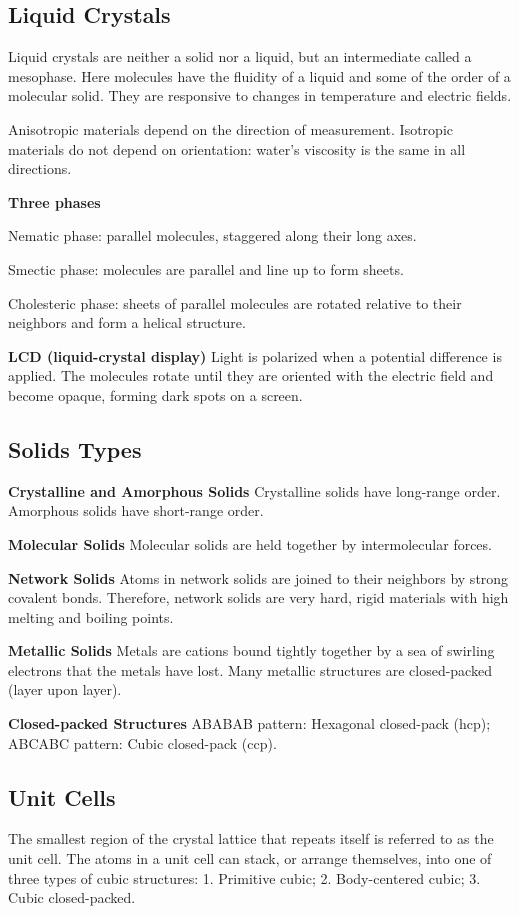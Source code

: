 \documentclass[a4paper,12pt]{article}
\begin{document}
\subsection{Liquid Crystals}
Liquid crystals are neither a solid nor a liquid, but an intermediate called a mesophase. Here molecules have the fluidity of a liquid and some of the order of a molecular solid. They are responsive to changes in temperature and electric fields.\par
Anisotropic materials depend on the direction of measurement. Isotropic materials do not depend on orientation: water’s viscosity is the same in all directions.\par
\textbf{Three phases}\par
Nematic phase: parallel molecules, staggered along their long axes.\par
Smectic phase: molecules are parallel and line up to form sheets.\par
Cholesteric phase: sheets of parallel molecules are rotated relative to their neighbors and form a helical structure.\par
\textbf{LCD (liquid-crystal display)} Light is polarized when a potential difference is applied. The molecules rotate until they are oriented with the electric field and become opaque, forming dark spots on a screen.
\subsection{Solids Types}
\textbf{Crystalline and Amorphous Solids} Crystalline solids have long-range order. Amorphous solids have short-range order.\par
\textbf{Molecular Solids} Molecular solids are held together by intermolecular forces.\par
\textbf{Network Solids} Atoms in network solids are joined to their neighbors by strong covalent bonds. Therefore, network solids are very hard, rigid materials with high melting and boiling points.\par
\textbf{Metallic Solids} Metals are cations bound tightly together by a sea of swirling electrons that the metals have lost. Many metallic structures are closed-packed (layer upon layer).\par
\textbf{Closed-packed Structures} ABABAB pattern: Hexagonal closed-pack (hcp); ABCABC pattern: Cubic closed-pack (ccp).
\subsection{Unit Cells}
The smallest region of the crystal lattice that repeats itself is referred to as the unit cell. The atoms in a unit cell can stack,
or arrange themselves, into one of three types of cubic structures: 1. Primitive cubic; 2. Body-centered cubic; 3. Cubic closed-packed.
\end{document}
